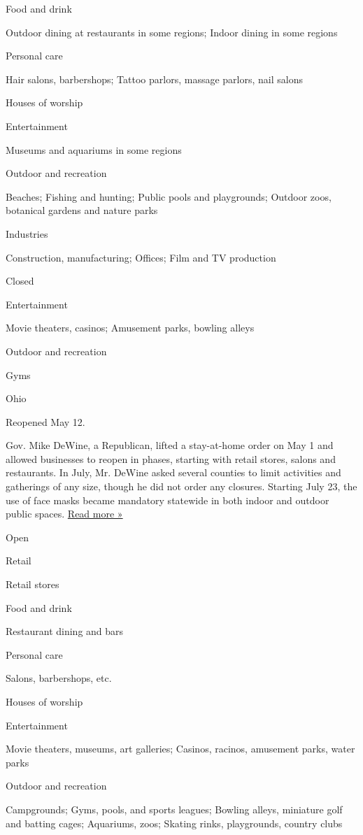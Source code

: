 Food and drink

Outdoor dining at restaurants in some regions; Indoor dining in some
regions

Personal care

Hair salons, barbershops; Tattoo parlors, massage parlors, nail salons

Houses of worship

Entertainment

Museums and aquariums in some regions

Outdoor and recreation

Beaches; Fishing and hunting; Public pools and playgrounds; Outdoor
zoos, botanical gardens and nature parks

Industries

Construction, manufacturing; Offices; Film and TV production

Closed

Entertainment

Movie theaters, casinos; Amusement parks, bowling alleys

Outdoor and recreation

Gyms

Ohio

Reopened May 12.

Gov. Mike DeWine, a Republican, lifted a stay-at-home order on May 1 and
allowed businesses to reopen in phases, starting with retail stores,
salons and restaurants. In July, Mr. DeWine asked several counties to
limit activities and gatherings of any size, though he did not order any
closures. Starting July 23, the use of face masks became mandatory
statewide in both indoor and outdoor public spaces.
\href{https://www.news5cleveland.com/news/state/ohio-gov-mike-dewine-announces-statewide-mask-mandate-effective-thursday}{Read
more »}

Open

Retail

Retail stores

Food and drink

Restaurant dining and bars

Personal care

Salons, barbershops, etc.

Houses of worship

Entertainment

Movie theaters, museums, art galleries; Casinos, racinos, amusement
parks, water parks

Outdoor and recreation

Campgrounds; Gyms, pools, and sports leagues; Bowling alleys, miniature
golf and batting cages; Aquariums, zoos; Skating rinks, playgrounds,
country clubs

